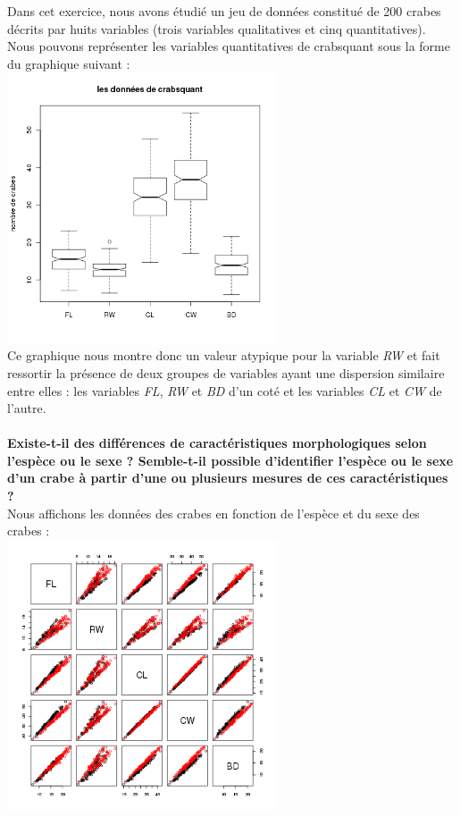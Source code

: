 \documentclass[a4paper, 10pt]{article}
\begin{document}
Dans cet exercice, nous avons \'etudi\'e un jeu de donn\'ees constitu\'e de 200 crabes d\'ecrits par huits variables
(trois variables qualitatives et cinq quantitatives).\\
Nous pouvons repr\'esenter les variables quantitatives de crabsquant sous la forme du graphique suivant :\\
\includegraphics[height = 8cm, width = 8cm]{plots/boxplot_crabsquant.png}\\
Ce graphique nous montre donc un valeur atypique pour la variable \textit{RW} et fait ressortir la pr\'esence de deux groupes de variables
ayant une dispersion similaire entre elles :
les variables \textit{FL}, \textit{RW} et \textit{BD} d'un cot\'e et les variables \textit{CL} et \textit{CW} de l'autre.\\ \\
\textbf{Existe-t-il des diff\'erences de caract\'eristiques morphologiques selon l'esp\`ece ou le sexe ?
Semble-t-il possible d'identifier l'esp\`ece ou le sexe d'un crabe \`a partir d'une ou plusieurs mesures de ces caract\'eristiques ?}\\
Nous affichons les donn\'ees des crabes en fonction de l'esp\`ece et du sexe des crabes :\\
\includegraphics[height = 8cm, width = 8cm]{plots/plot_crabsquant_sp.png}
\end{document}
